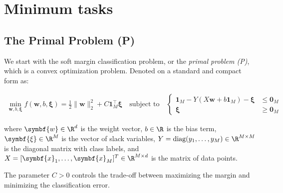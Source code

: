 \chapter{Minimum tasks}
\section{The Primal Problem (P)}

We start with the soft margin classification problem, or the \emph{primal problem (P)}, which is a convex optimization problem.
Denoted on a standard and compact form as:

\begin{align*}\label{eq:soft-margin-problem}
  \min_{\symbf{w}, b, \symbf{\xi}} f(\symbf{w}, b, \symbf{\xi}) = \frac{1}{2}\|\symbf{w}\|_2^2 + C\symbf{1}_M^\top \symbf{\xi} 
  \quad \text{subject to} \quad 
  \begin{cases}
    \symbf{1}_M - Y(X\symbf{w} + b\symbf{1}_M) - \symbf{\xi} & \leq \symbf{0}_M \\
    \symbf{\xi}                                              & \geq \symbf{0}_M
  \end{cases}\tag{P}
\end{align*}

where $\symbf{w} \in \R^d$ is the weight vector, 
$b \in \R$ is the bias term, 
$\symbf{\xi} \in \R^M$ is the vector of slack variables, 
$Y = \text{diag}(y_1, \ldots, y_M) \in \R^{M \times M}$ is the diagonal matrix with class labels, 
and $X = [\symbf{x}_1, \ldots, \symbf{x}_M]^T \in \R^{M \times d}$ is the matrix of data points.

The parameter $C > 0$ controls the trade-off between maximizing the margin and minimizing the classification error.

